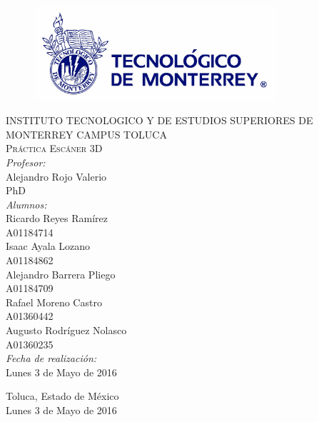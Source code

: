 \begin{titlepage}
\begin{center}
\begin{figure}[!htbp]
\centering
\includegraphics[width=90mm]{./img/logo_itesm.jpg}
\end{figure}


\textsc{ INSTITUTO TECNOLOGICO Y DE ESTUDIOS SUPERIORES DE MONTERREY
CAMPUS TOLUCA}\\[1.5cm]

\textsc{ Pr\'actica Esc\'aner 3D}\\[0.5cm]


\emph{Profesor:}\\
 Alejandro Rojo Valerio\\
 PhD\\
 \medskip
\emph{Alumnos:} \\
Ricardo Reyes Ram\'irez\\A01184714\\
Isaac Ayala Lozano\\A01184862\\
Alejandro Barrera Pliego\\A01184709\\
Rafael Moreno Castro\\A01360442\\
Augusto Rodr\'iguez Nolasco\\A01360235\\

 \medskip
\emph{Fecha de realizaci\'on:}\\
Lunes 3 de Mayo de 2016\\
\vfill


{\large
Toluca, Estado de M\'exico\\
Lunes 3 de Mayo de 2016
}

\end{center}
\end{titlepage}
